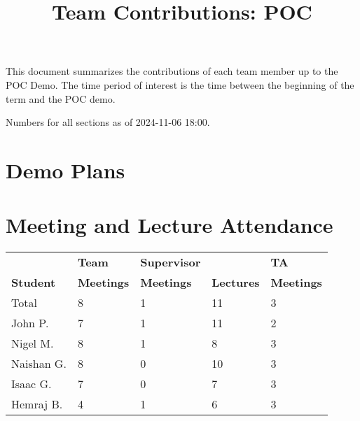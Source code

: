 \documentclass{article}
\title{Team Contributions: POC\\\progname}
\author{\authname}
\date{}
\begin{document}
\maketitle

This document summarizes the contributions of each team member up to the POC
Demo.  The time period of interest is the time between the beginning of the term
and the POC demo.

Numbers for all sections as of 2024-11-06 18:00.

\section{Demo Plans}


\newpage
\section{Meeting and Lecture Attendance}





\begin{table}[H]
\centering
\begin{tabular}{lllll}
\toprule
\textbf{ } & \textbf{Team} & \textbf{Supervisor} & \textbf{ } & \textbf{TA}\\
\textbf{Student} & \textbf{Meetings} & \textbf{Meetings} & \textbf{Lectures} & \textbf{Meetings}\\
\midrule
Total & 8 & 1 & 11 & 3\\
\midrule
John P. & 7 & 1 & 11 & 2\\
Nigel M. & 8 & 1 & 8 & 3\\
Naishan G. & 8 & 0 & 10 & 3\\
Isaac G. & 7 & 0 & 7 & 3\\
Hemraj B. & 4 & 1 & 6 & 3\\
\bottomrule
\end{tabular}
\end{table}
\end{document}
